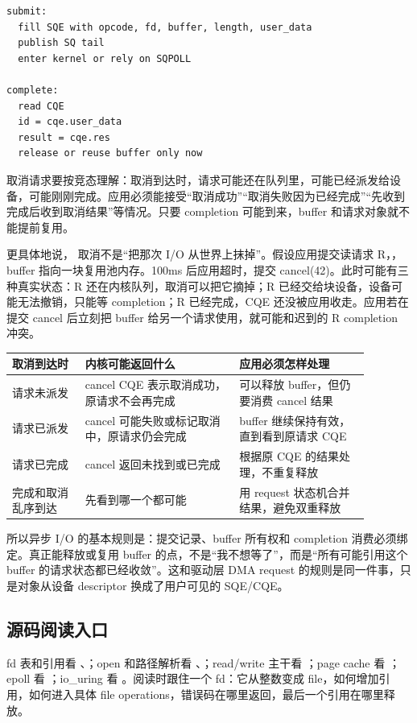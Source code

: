 \begin{lstlisting}
submit:
  fill SQE with opcode, fd, buffer, length, user_data
  publish SQ tail
  enter kernel or rely on SQPOLL

complete:
  read CQE
  id = cqe.user_data
  result = cqe.res
  release or reuse buffer only now
\end{lstlisting}

取消请求要按竞态理解：取消到达时，请求可能还在队列里，可能已经派发给设备，可能刚刚完成。应用必须能接受“取消成功”“取消失败因为已经完成”“先收到完成后收到取消结果”等情况。只要 completion 可能到来，buffer 和请求对象就不能提前复用。

更具体地说， 取消不是“把那次 I/O 从世界上抹掉”。假设应用提交读请求 R，，buffer 指向一块复用池内存。100ms 后应用超时，提交 cancel(42)。此时可能有三种真实状态：R 还在内核队列，取消可以把它摘掉；R 已经交给块设备，设备可能无法撤销，只能等 completion；R 已经完成，CQE 还没被应用收走。应用若在提交 cancel 后立刻把 buffer 给另一个请求使用，就可能和迟到的 R completion 冲突。

\begin{longtable}{|p{0.18\linewidth}|p{0.38\linewidth}|p{0.32\linewidth}|}
\toprule
取消到达时 & 内核可能返回什么 & 应用必须怎样处理 \\
\midrule
请求未派发 & cancel CQE 表示取消成功，原请求不会再完成 & 可以释放 buffer，但仍要消费 cancel 结果 \\\tablerowrule
请求已派发 & cancel 可能失败或标记取消中，原请求仍会完成 & buffer 继续保持有效，直到看到原请求 CQE \\\tablerowrule
请求已完成 & cancel 返回未找到或已完成 & 根据原 CQE 的结果处理，不重复释放 \\\tablerowrule
完成和取消乱序到达 & 先看到哪一个都可能 & 用 request 状态机合并结果，避免双重释放 \\
\bottomrule
\end{longtable}

所以异步 I/O 的基本规则是：提交记录、buffer 所有权和 completion 消费必须绑定。真正能释放或复用 buffer 的点，不是“我不想等了”，而是“所有可能引用这个 buffer 的请求状态都已经收敛”。这和驱动层 DMA request 的规则是同一件事，只是对象从设备 descriptor 换成了用户可见的 SQE/CQE。

\subsection{源码阅读入口}

fd 表和引用看 、；open 和路径解析看 、；read/write 主干看 ；page cache 看 ；epoll 看 ；io\_uring 看 。阅读时跟住一个 fd：它从整数变成 file，如何增加引用，如何进入具体 file operations，错误码在哪里返回，最后一个引用在哪里释放。

